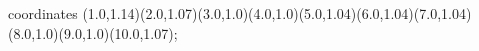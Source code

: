 					coordinates { (1.0,1.14)(2.0,1.07)(3.0,1.0)(4.0,1.0)(5.0,1.04)(6.0,1.04)(7.0,1.04)(8.0,1.0)(9.0,1.0)(10.0,1.07)};